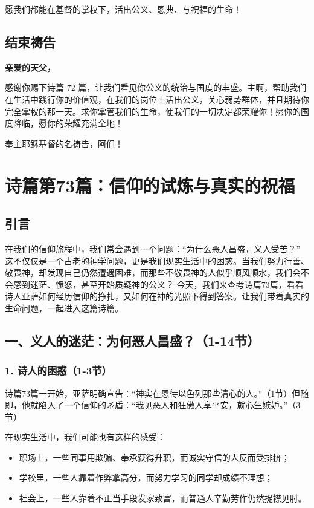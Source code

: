 \documentclass[a4paper, 12pt]{article}
\begin{document}
愿我们都能在基督的掌权下，活出公义、恩典、与祝福的生命！

\subsection*{结束祷告}
\textbf{亲爱的天父，}

感谢你赐下诗篇 72 篇，让我们看见你公义的统治与国度的丰盛。主啊，帮助我们在生活中践行你的价值观，在我们的岗位上活出公义，关心弱势群体，并且期待你完全掌权的那一天。求你掌管我们的生命，使我们的一切决定都荣耀你！愿你的国度降临，愿你的荣耀充满全地！

奉主耶稣基督的名祷告，阿们！
\newpage
\section{诗篇第73篇：信仰的试炼与真实的祝福}
\subsection*{引言}
在我们的信仰旅程中，我们常会遇到一个问题：“为什么恶人昌盛，义人受苦？” 这不仅仅是一个古老的神学问题，更是我们现实生活中的困惑。当我们努力行善、敬畏神，却发现自己仍然遭遇困难，而那些不敬畏神的人似乎顺风顺水，我们会不会感到迷茫、愤怒，甚至开始质疑神的公义？
今天，我们来查考诗篇73篇，看看诗人亚萨如何经历信仰的挣扎，又如何在神的光照下得到答案。让我们带着真实的生命问题，一起进入这篇诗篇。
\subsection*{一、义人的迷茫：为何恶人昌盛？（1-14节）}
\subsubsection*{1. 诗人的困惑（1-3节）}
\hspace{0.6cm}诗篇73篇一开始，亚萨明确宣告：“神实在恩待以色列那些清心的人。”（1节）但随即，他就陷入了一个信仰的矛盾：“我见恶人和狂傲人享平安，就心生嫉妒。”（3节）

在现实生活中，我们可能也有这样的感受：
\begin{itemize}
    \item 职场上，一些同事用欺骗、奉承获得升职，而诚实守信的人反而受排挤；

    \item 学校里，一些人靠着作弊拿高分，而努力学习的同学却成绩不理想；

    \item 社会上，一些人靠着不正当手段发家致富，而普通人辛勤劳作仍然捉襟见肘。

\end{itemize}
\end{document}
